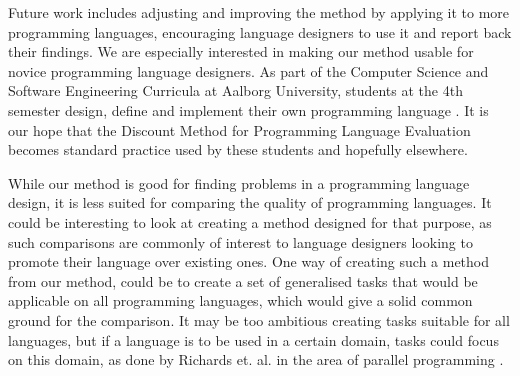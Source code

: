 \documentclass[preprint,10pt]{sigplanconf}
\begin{document}




Future work includes adjusting and improving the method by applying it to more programming languages, encouraging language designers to use it and report back their findings.
We are especially interested in making our method usable for novice programming language designers. 
As part of the Computer Science and Software Engineering Curricula at Aalborg University, students at the 4th semester design, define and implement their own programming language \cite{toce2016}. It is our hope that the Discount Method for Programming Language Evaluation becomes standard practice used by these students and hopefully elsewhere.


While our method is good for finding problems in a programming language design, it is less suited for comparing the quality of programming languages.
It could be interesting to look at creating a method designed for that purpose, as such comparisons are commonly of interest to language designers looking to promote their language over existing ones.
One way of creating such a method from our method, could be to create a set of generalised tasks that would be applicable on all programming languages, which would give a solid common ground for the comparison. It may be too ambitious creating tasks suitable for all languages, but if a language is to be used in a certain domain, tasks could focus on this domain, as done by Richards et. al. in the area of parallel programming \cite{richards2014productivity}.
\end{document}
